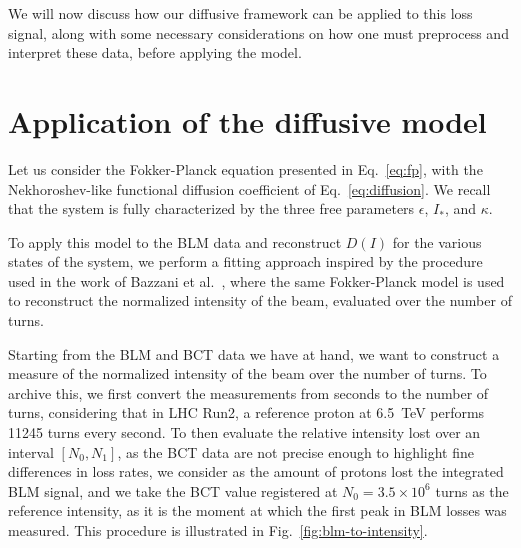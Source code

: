 We will now discuss how our diffusive framework can be applied to this loss signal, along with some necessary considerations on how one must preprocess and interpret these data, before applying the model. 

\section{Application of the diffusive model}

Let us consider the Fokker-Planck equation presented in Eq.~\eqref{eq:fp}, with the Nekhoroshev-like functional diffusion coefficient of Eq.~\eqref{eq:diffusion}. We recall that the system is fully characterized by the three free parameters $\epsilon$, $I_\ast$, and $\kappa$.

To apply this model to the BLM data and reconstruct $D(I)$ for the various states of the system, we perform a fitting approach inspired by the procedure used in the work of Bazzani et al.~\cite{bazzani2020diffusion}, where the same Fokker-Planck model is used to reconstruct the normalized intensity of the beam, evaluated over the number of turns.

Starting from the BLM and BCT data we have at hand, we want to construct a measure of the normalized intensity of the beam over the number of turns. To archive this, we first convert the measurements from seconds to the number of turns, considering that in LHC Run2, a reference proton at \SI{6.5}{TeV} performs 11245 turns every second. To then evaluate the relative intensity lost over an interval $[N_0, N_1]$, as the BCT data are not precise enough to highlight fine differences in loss rates, we consider as the amount of protons lost the integrated BLM signal, and we take the BCT value registered at $N_0=3.5\times10^6$ turns as the reference intensity, as it is the moment at which the first peak in BLM losses was measured. This procedure is illustrated in Fig.~\ref{fig:blm-to-intensity}.


